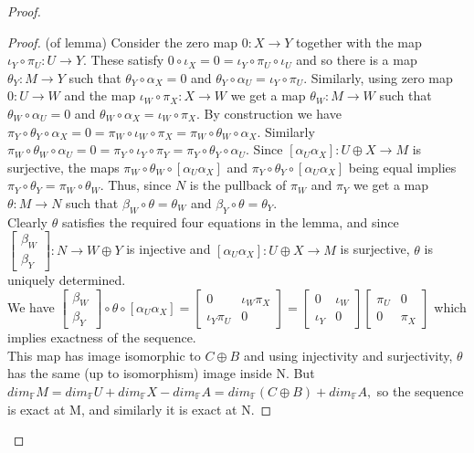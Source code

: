 \documentclass{book}
\begin{document}
\begin{proof}
\begin{proof}(of lemma) Consider the zero map $0:X \rightarrow Y$ together with the map $\iota_Y \circ \pi_U : U \rightarrow Y$. These satisfy $0\circ \iota_X = 0 = \iota_Y \circ \pi_U \circ \iota_U$ and so there is a map $\theta_Y:M\rightarrow Y $ such that $\theta_Y \circ \alpha_X = 0$ and $\theta_Y \circ \alpha_U = \iota_Y \circ \pi_U$. Similarly, using zero map $0:U \rightarrow W$ and the map $\iota_W \circ \pi_X :X \rightarrow W$ we get a map $\theta_W :M \rightarrow W$ such that $\theta_W \circ \alpha_U =0$ and $\theta_W \circ \alpha_X = \iota_W \circ \pi_X$. By construction we have $\pi_Y \circ \theta_Y \circ \alpha_X = 0 = \pi_W \circ \iota_W \circ \pi_X = \pi_W \circ \theta_W \circ \alpha_X.$ Similarly $\pi_W \circ \theta_W \circ \alpha_U = 0 = \pi_Y \circ \iota_Y \circ \pi_Y = \pi_Y \circ \theta_Y \circ \alpha_U.$ Since $[\alpha_U \alpha_X] : U \oplus X \rightarrow M$ is surjective, the maps $\pi_W \circ \theta_W \circ [\alpha_U \alpha_X]$ and $\pi_Y \circ \theta_Y \circ [\alpha_U \alpha_X]$ being equal implies $\pi_Y \circ \theta_Y = \pi_W \circ \theta_W$. Thus, since $N$ is the pullback of $\pi_W$ and $\pi_Y$ we get a map $\theta : M\rightarrow N$ such that $\beta_W \circ \theta = \theta_W$ and  $\beta_Y \circ \theta = \theta_Y$. \\
Clearly $\theta$ satisfies the required four equations in the lemma, and since $\begin{bmatrix} \beta_W \\ \beta_Y \end{bmatrix}:N \rightarrow W\oplus Y$ is injective and $[\alpha_U \alpha_X] : U \oplus X \rightarrow M$ is surjective, $\theta$ is uniquely determined. \\
We have $\begin{bmatrix} \beta_W \\ \beta_Y \end{bmatrix} \circ \theta \circ [\alpha_U \alpha_X] = \begin{bmatrix} 0 &  \iota_W \pi_X \\ \iota_Y \pi_U & 0 \end{bmatrix} = \begin{bmatrix} 0 &  \iota_W \\ \iota_Y  & 0 \end{bmatrix}  \begin{bmatrix}\pi_U &0 \\ 0 & \pi_X \end{bmatrix} $ which implies exactness of the sequence.\\
This map has image isomorphic to $C\oplus B$ and using injectivity and surjectivity, $\theta$ has the same (up to isomorphism) image inside N. But $dim_\mathbb{F}M =dim_\mathbb{F}U +dim_\mathbb{F}X -dim_\mathbb{F}A =dim_\mathbb{F}(C\oplus B)+dim_\mathbb{F}A,$ so the sequence is exact at M, and similarly it is exact at N.
\end{proof}

\end{proof}
\end{document}
